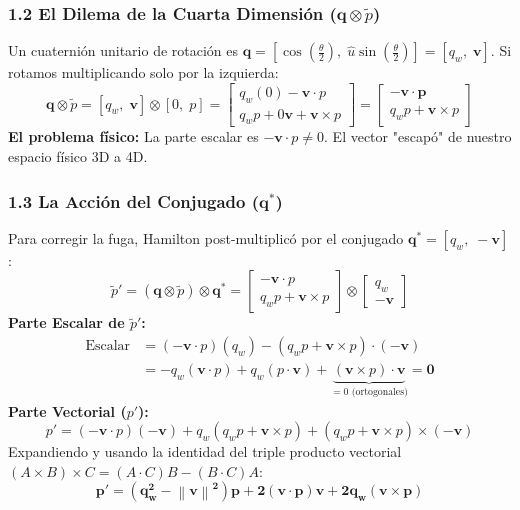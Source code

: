 \documentclass[11pt, a4paper]{article}
\begin{document}
\subsubsection*{1.2 El Dilema de la Cuarta Dimensión ($\mathbf{q} \otimes \tilde{p}$)}
Un cuaternión unitario de rotación es $\mathbf{q} = \left[ \cos(\frac{\theta}{2}), \; \hat{u} \sin(\frac{\theta}{2}) \right] = [q_w, \; \mathbf{v}]$. Si rotamos multiplicando solo por la izquierda:
\begin{equation*}
    \mathbf{q} \otimes \tilde{p} = [q_w, \; \mathbf{v}] \otimes [0, \; p] = \begin{bmatrix} q_w (0) - \mathbf{v} \cdot p \\ q_w p + 0\mathbf{v} + \mathbf{v} \times p \end{bmatrix} = \begin{bmatrix} \mathbf{-\mathbf{v} \cdot p} \\ q_w p + \mathbf{v} \times p \end{bmatrix}
\end{equation*}
\textbf{El problema físico:} La parte escalar es $-\mathbf{v} \cdot p \neq 0$. El vector "escapó" de nuestro espacio físico 3D a 4D.

\subsubsection*{1.3 La Acción del Conjugado ($\mathbf{q}^*$)}
Para corregir la fuga, Hamilton post-multiplicó por el conjugado $\mathbf{q}^* = [q_w, \; -\mathbf{v}]$:
\begin{equation*}
    \tilde{p}' = (\mathbf{q} \otimes \tilde{p}) \otimes \mathbf{q}^* = \begin{bmatrix} -\mathbf{v} \cdot p \\ q_w p + \mathbf{v} \times p \end{bmatrix} \otimes \begin{bmatrix} q_w \\ -\mathbf{v} \end{bmatrix}
\end{equation*}
\textbf{Parte Escalar de $\tilde{p}'$:}
\begin{align*}
    \text{Escalar} &= (-\mathbf{v} \cdot p)(q_w) - \left( q_w p + \mathbf{v} \times p \right) \cdot (-\mathbf{v}) \\
    &= -q_w(\mathbf{v} \cdot p) + q_w(p \cdot \mathbf{v}) + \underbrace{(\mathbf{v} \times p) \cdot \mathbf{v}}_{= 0 \text{ (ortogonales)}} = \mathbf{0}
\end{align*}
\textbf{Parte Vectorial ($p'$):}
\begin{equation*}
    p' = (-\mathbf{v} \cdot p)(-\mathbf{v}) + q_w(q_w p + \mathbf{v} \times p) + (q_w p + \mathbf{v} \times p) \times (-\mathbf{v})
\end{equation*}
Expandiendo y usando la identidad del triple producto vectorial $(A \times B) \times C = (A \cdot C)B - (B \cdot C)A$:
\begin{equation}
    \mathbf{p' = (q_w^2 - \left\|\mathbf{v}\right\|^2)p + 2(\mathbf{v} \cdot p)\mathbf{v} + 2q_w(\mathbf{v} \times p)}
\end{equation}
\end{document}
